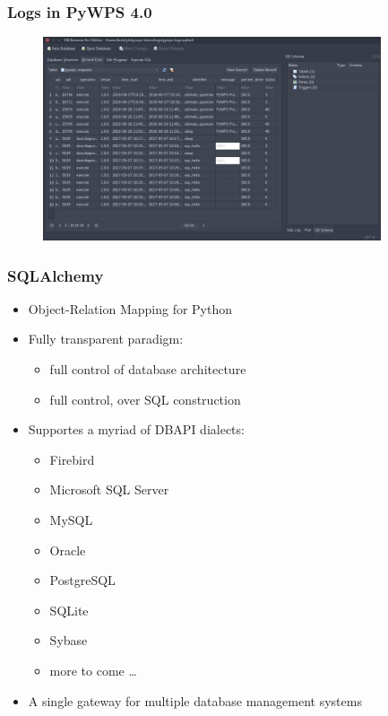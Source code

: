 \documentclass{beamer}
\begin{document}
\begin{frame}
\frametitle<presentation>{Logs in PyWPS 4.0}

  \begin{figure}[ht]
   \centering
   \includegraphics[height=6cm]{figures/SQLiteBrowser}
  \end{figure}

\end{frame}


\begin{frame}
\frametitle<presentation>{SQLAlchemy}


\begin{itemize}
  \item Object-Relation Mapping for Python
  \item Fully transparent paradigm:
  \begin{itemize} 
    \item full control of database architecture 
    \item full control, over SQL construction
  \end{itemize}
  \item Supportes a myriad of DBAPI dialects:
  \begin{itemize}
    \item Firebird
    \item Microsoft SQL Server
    \item MySQL
    \item Oracle
    \item PostgreSQL
    \item SQLite
    \item Sybase
    \item more to come \ldots
  \end{itemize}
  \item A single gateway for multiple database management systems
\end{itemize}

\end{frame}
\end{document}
